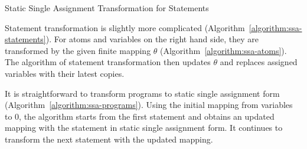 \begin{algorithm}
\begin{algorithmic}[1]
      \EndCase
      \EndCase
      \EndCase
    \EndMatch
    \EndFunction
  \end{algorithmic}
  \caption{Static Single Assignment Transformation for Statements}
  \label{algorithm:ssa-statements}
\end{algorithm}

Statement transformation is slightly more complicated
(Algorithm~\ref{algorithm:ssa-statements}). For
atoms and variables on the right hand side, they are transformed by the given
finite mapping $\theta$ (Algorithm~\ref{algorithm:ssa-atoms}).
The algorithm of statement transformation then updates $\theta$ and
replaces assigned variables with their latest copies.

It is straightforward to transform programs to static single
assignment form (Algorithm~\ref{algorithm:ssa-programs}). Using the
initial mapping from variables to $0$,
the algorithm starts from the first statement and obtains an
updated mapping with the statement in static single assignment form. It
continues to transform the next statement with the updated mapping.

